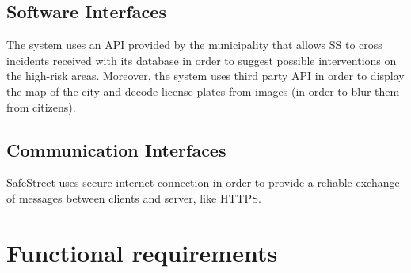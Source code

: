 \documentclass[../RASD.tex]{subfiles}
\begin{document}
            \subsection{Software Interfaces}\label{subsec:software-interfaces}
            The system uses an API provided by the municipality that allows SS to cross incidents received with its database in order to suggest possible interventions on the high-risk areas. Moreover, the system uses third party API in order to display the map of the city and decode license plates from images (in order to blur them from citizens).
            \subsection{Communication Interfaces}\label{subsec:communication-interface}
            SafeStreet uses secure internet connection in order to provide a reliable exchange of messages between clients and server, like HTTPS.
        \section{Functional requirements}\label{sec:functional-requirements}
\end{document}
